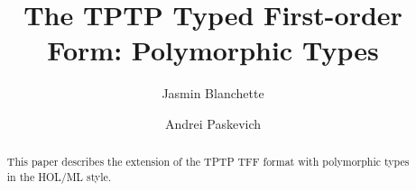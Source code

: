 \documentclass[draft,a4paper]{llncs}
\begin{document}
\title{
The TPTP Typed First-order Form: Polymorphic Types}

\author{
Jasmin Blanchette \and Andrei Paskevich
}


\maketitle

\begin{abstract}
This paper describes the extension of the TPTP TFF format with polymorphic
types in the HOL/ML style.
\end{abstract}



%
%
\end{document}
